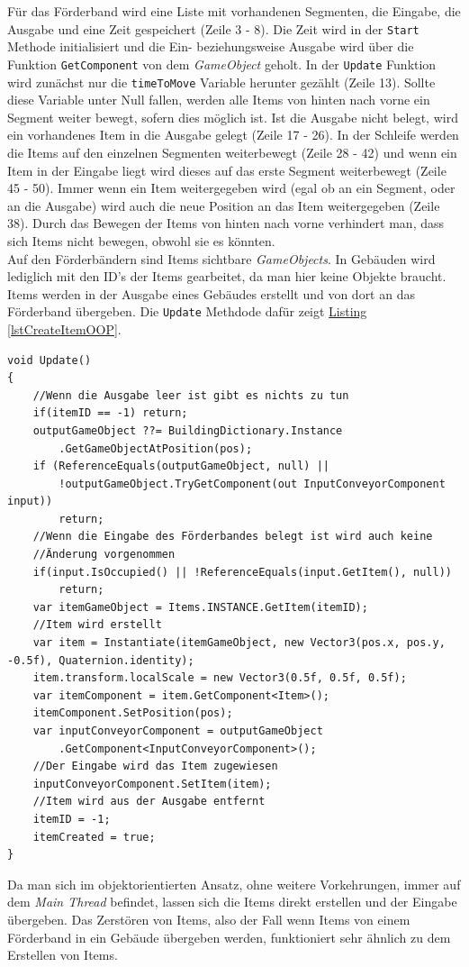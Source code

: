 Für das Förderband wird eine Liste mit vorhandenen Segmenten, die Eingabe, die Ausgabe und eine Zeit gespeichert (Zeile 3 - 8). Die Zeit wird in der \texttt{Start} Methode initialisiert und die Ein- beziehungsweise Ausgabe wird über die Funktion \texttt{GetComponent} von dem \textit{GameObject} geholt. In der \texttt{Update} Funktion wird zunächst nur die \texttt{timeToMove} Variable herunter gezählt (Zeile 13). Sollte diese Variable unter Null fallen, werden alle Items von hinten nach vorne ein Segment weiter bewegt, sofern dies möglich ist. Ist die Ausgabe nicht belegt, wird ein vorhandenes Item in die Ausgabe gelegt (Zeile 17 - 26). In der Schleife werden die Items auf den einzelnen Segmenten weiterbewegt (Zeile 28 - 42) und wenn ein Item in der Eingabe liegt wird dieses auf das erste Segment weiterbewegt (Zeile 45 - 50). Immer wenn ein Item weitergegeben wird (egal ob an ein Segment, oder an die Ausgabe) wird auch die neue Position an das Item weitergegeben (Zeile 38). Durch das Bewegen der Items von hinten nach vorne verhindert man, dass sich Items nicht bewegen, obwohl sie es könnten.\\
Auf den Förderbändern sind Items sichtbare \textit{GameObjects}. In Gebäuden wird lediglich mit den ID's der Items gearbeitet, da man hier keine Objekte braucht. Items werden in der Ausgabe eines Gebäudes erstellt und von dort an das Förderband übergeben.  Die \texttt{Update} Methdode dafür zeigt \hyperref[lstCreateItemOOP]{Listing \ref*{lstCreateItemOOP}}.
\begin{lstlisting}[style=code, caption={[Erstellung eines Items im objektorientierten Ansatz]Erstellung eines Items im objektorientierten Ansatz. Wenn ein Förderband verbunden ist und ein Item erstellt werden soll, wird das passende \textit{GameObject} instanziert. Dieses wird dann an das Förderband übergeben.}, label=lstCreateItemOOP]
void Update()
{
    //Wenn die Ausgabe leer ist gibt es nichts zu tun
    if(itemID == -1) return;
    outputGameObject ??= BuildingDictionary.Instance
        .GetGameObjectAtPosition(pos);
    if (ReferenceEquals(outputGameObject, null) ||
        !outputGameObject.TryGetComponent(out InputConveyorComponent input))
        return;
    //Wenn die Eingabe des Förderbandes belegt ist wird auch keine
    //Änderung vorgenommen
    if(input.IsOccupied() || !ReferenceEquals(input.GetItem(), null))
        return;
    var itemGameObject = Items.INSTANCE.GetItem(itemID);
    //Item wird erstellt
    var item = Instantiate(itemGameObject, new Vector3(pos.x, pos.y, -0.5f), Quaternion.identity);
    item.transform.localScale = new Vector3(0.5f, 0.5f, 0.5f);
    var itemComponent = item.GetComponent<Item>();
    itemComponent.SetPosition(pos);
    var inputConveyorComponent = outputGameObject
        .GetComponent<InputConveyorComponent>();
    //Der Eingabe wird das Item zugewiesen
    inputConveyorComponent.SetItem(item);
    //Item wird aus der Ausgabe entfernt
    itemID = -1;
    itemCreated = true;
}
\end{lstlisting}
Da man sich im objektorientierten Ansatz, ohne weitere Vorkehrungen, immer auf dem \textit{Main Thread} befindet, lassen sich die Items direkt erstellen und der Eingabe übergeben. Das Zerstören von Items, also der Fall wenn Items von einem Förderband in ein Gebäude übergeben werden, funktioniert sehr ähnlich zu dem Erstellen von Items.